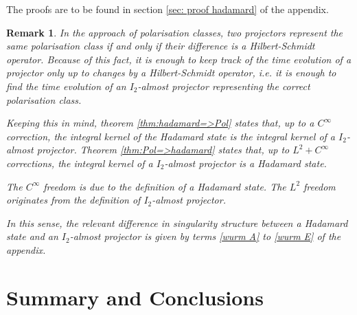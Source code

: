 \documentclass[b5paper,draft,openbib,12pt]{memoir}
\newtheorem{Remark}[Def]{Remark}
\begin{document}
The proofs are to be found in section 
\ref{sec: proof hadamard} of the appendix.

\begin{Remark}
In the approach of polarisation classes, two projectors represent the same polarisation class if and only if their difference is a Hilbert-Schmidt operator. 
Because of this fact, it is enough to keep track of the time evolution of a projector only up to changes by a Hilbert-Schmidt operator, i.e. it is enough
to find the time evolution of an \(I_2\)-almost projector representing the correct polarisation class. 

Keeping this in mind,
theorem \ref{thm:hadamard=>Pol} states that, up to a \(C^\infty\) 
correction, the integral kernel of the Hadamard state is the integral 
kernel of a \(I_2\)-almost projector.
Theorem \ref{thm:Pol=>hadamard} states that, up to \(L^2+C^\infty\) 
corrections, the integral kernel of a \(I_2\)-almost projector is a 
Hadamard state.

The \(C^\infty\) freedom is due to the definition of a 
Hadamard state. The \(L^2\) freedom originates from the definition 
of \(I_2\)-almost projector.

In this sense, the relevant difference in  singularity structure 
between a Hadamard state and an 
\(I_2\)-almost projector is given by terms 
\eqref{wurm A} to  \eqref{wurm E} of the appendix.
\end{Remark}

\section{Summary and Conclusions}
\end{document}
